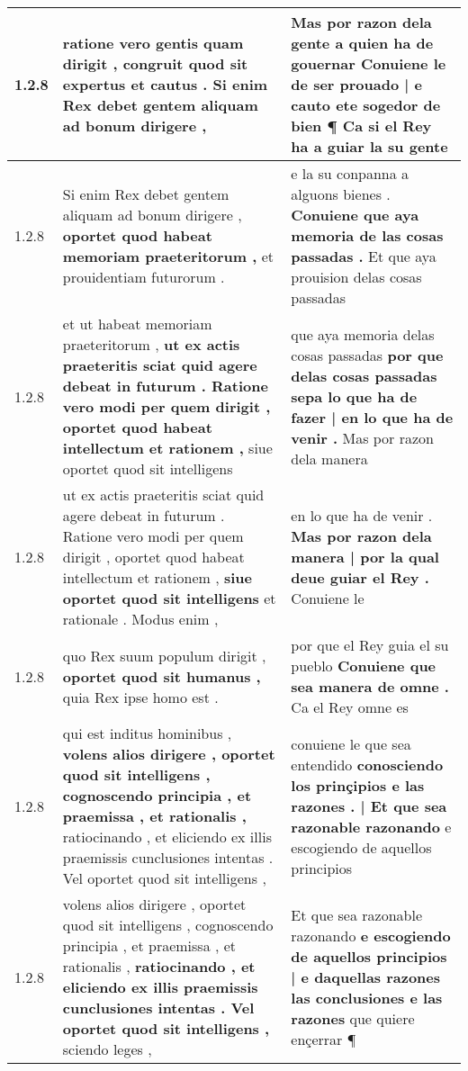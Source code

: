 \begin{tabular}{|p{1cm}|p{6.5cm}|p{6.5cm}|}
1.2.8 & ratione vero gentis quam dirigit , \textbf{ congruit quod sit expertus et cautus . } Si enim Rex debet gentem aliquam ad bonum dirigere , & Mas por razon dela gente a quien ha de gouernar \textbf{ Conuiene le de ser prouado | e cauto ete sogedor de bien ¶ } Ca si el Rey ha a guiar la su gente \\\hline
1.2.8 & Si enim Rex debet gentem aliquam ad bonum dirigere , \textbf{ oportet quod habeat memoriam praeteritorum , } et prouidentiam futurorum . & e la su conpanna a alguons bienes . \textbf{ Conuiene que aya memoria de las cosas passadas . } Et que aya prouision delas cosas passadas \\\hline
1.2.8 & et ut habeat memoriam praeteritorum , \textbf{ ut ex actis praeteritis sciat quid agere debeat in futurum . Ratione vero modi per quem dirigit , oportet quod habeat intellectum et rationem , } siue oportet quod sit intelligens & que aya memoria delas cosas passadas \textbf{ por que delas cosas passadas sepa lo que ha de fazer | en lo que ha de venir . } Mas por razon dela manera \\\hline
1.2.8 & ut ex actis praeteritis sciat quid agere debeat in futurum . Ratione vero modi per quem dirigit , oportet quod habeat intellectum et rationem , \textbf{ siue oportet quod sit intelligens } et rationale . Modus enim , & en lo que ha de venir . \textbf{ Mas por razon dela manera | por la qual deue guiar el Rey . } Conuiene le \\\hline
1.2.8 & quo Rex suum populum dirigit , \textbf{ oportet quod sit humanus , } quia Rex ipse homo est . & por que el Rey guia el su pueblo \textbf{ Conuiene que sea manera de omne . } Ca el Rey omne es \\\hline
1.2.8 & qui est inditus hominibus , \textbf{ volens alios dirigere , oportet quod sit intelligens , cognoscendo principia , et praemissa , et rationalis , } ratiocinando , et eliciendo ex illis praemissis cunclusiones intentas . Vel oportet quod sit intelligens , & conuiene le que sea entendido \textbf{ conosciendo los prinçipios e las razones . | Et que sea razonable razonando } e escogiendo de aquellos principios \\\hline
1.2.8 & volens alios dirigere , oportet quod sit intelligens , cognoscendo principia , et praemissa , et rationalis , \textbf{ ratiocinando , et eliciendo ex illis praemissis cunclusiones intentas . Vel oportet quod sit intelligens , } sciendo leges , & Et que sea razonable razonando \textbf{ e escogiendo de aquellos principios | e daquellas razones las conclusiones e las razones } que quiere ençerrar ¶ \\\hline

\end{tabular}
